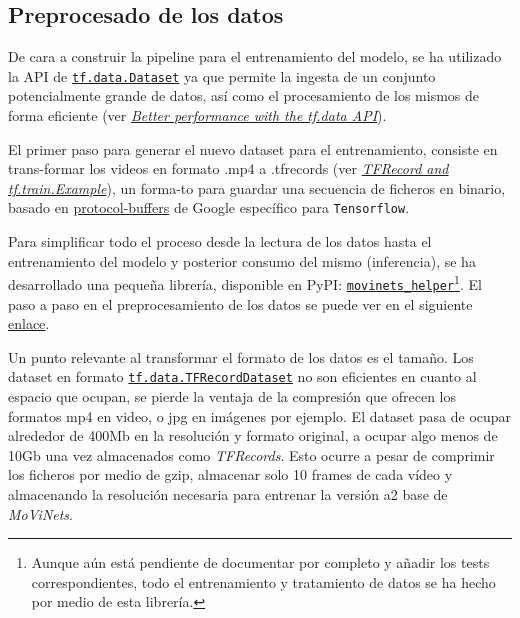 \subsection{Preprocesado de los datos}

De cara a construir la pipeline para el entrenamiento del modelo, se ha utilizado la API de \href{https://www.tensorflow.org/api_docs/python/tf/data/Dataset}{\texttt{tf.data.Dataset}} ya que permite la ingesta de un conjunto potencialmente grande de datos, así como el procesamiento de los mismos de forma eficiente (ver \href{https://www.tensorflow.org/guide/data_performance}{\textit{Better performance with the tf.data API}}).

El primer paso para generar el nuevo dataset para el entrenamiento, consiste en trans-formar los videos en formato .mp4 a .tfrecords (ver \href{https://www.tensorflow.org/tutorials/load_data/tfrecord}{\textit{TFRecord and tf.train.Example}}), un forma-to para guardar una secuencia de ficheros en binario, basado en \href{https://developers.google.com/protocol-buffers/}{protocol-buffers} de Google específico para \texttt{Tensorflow}.

Para simplificar todo el proceso desde la lectura de los datos hasta el entrenamiento del modelo y posterior consumo del mismo (inferencia), se ha desarrollado una pequeña librería, disponible en PyPI: \href{https://pypi.org/project/movinets_helper/}{\texttt{movinets\_helper}}\footnote{Aunque aún está pendiente de documentar por completo y añadir los tests correspondientes, todo el entrenamiento y tratamiento de datos se ha hecho por medio de esta librería.}. El paso a paso en el preprocesamiento de los datos se puede ver en el siguiente \href{https://plaguss.github.io/movinets_helper/how-to-guides/#how-to-create-a-dataset}{enlace}.

Un punto relevante al transformar el formato de los datos es el tamaño. Los dataset en formato \href{https://www.tensorflow.org/api_docs/python/tf/data/TFRecordDataset}{\texttt{tf.data.TFRecordDataset}} no son eficientes en cuanto al espacio que ocupan, se pierde la ventaja de la compresión que ofrecen los formatos mp4 en video, o jpg en imágenes por ejemplo. El dataset pasa de ocupar alrededor de 400Mb en la resolución y formato original, a ocupar algo menos de 10Gb una vez almacenados como \textit{TFRecords}. Esto ocurre a pesar de comprimir los ficheros por medio de gzip, almacenar solo 10 frames de cada vídeo y almacenando la resolución necesaria para entrenar la versión a2 base de \textit{MoViNets}.

